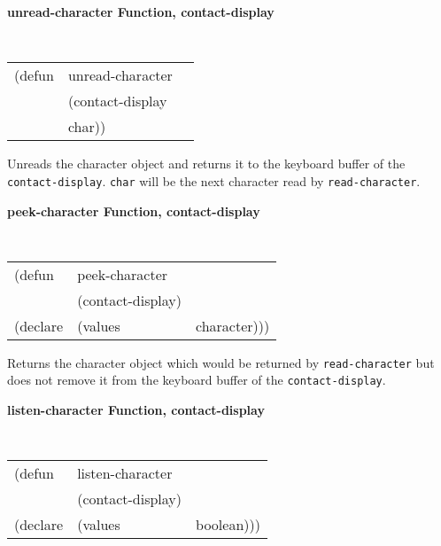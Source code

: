 \documentclass[twoside]{book}
\begin{document}
\begin{sloppy}
\begin{flushright}
{}\end{flushright}


{\samepage
{\large {\bf unread-character \hfill Function, contact-display}}
\begin{flushright} \parbox[t]{6.125in}{
\tt
\begin{tabular}{lll}
\raggedright
(defun & unread-character & \\
& (contact-display\\
& char))
\end{tabular}
\rm

}\end{flushright}}

\begin{flushright} \parbox[t]{6.125in}{
Unreads the character object and returns it to the keyboard buffer of the
{\tt contact-display}. {\tt char} will be the next
character read by {\tt read-character}.

}\end{flushright}


{\samepage
{\large {\bf peek-character \hfill Function, contact-display}}
\begin{flushright} \parbox[t]{6.125in}{
\tt
\begin{tabular}{lll}
\raggedright
(defun & peek-character & \\
& (contact-display)\\
(declare &(values &character)))
\end{tabular}
\rm

}\end{flushright}}

\begin{flushright} \parbox[t]{6.125in}{
Returns the character object which would be returned by {\tt read-character} but does
not remove it from the keyboard buffer of the {\tt contact-display}.

}\end{flushright}



{\samepage
{\large {\bf listen-character \hfill Function, contact-display}}
\begin{flushright} \parbox[t]{6.125in}{
\tt
\begin{tabular}{lll}
\raggedright
(defun & listen-character & \\
& (contact-display)\\
(declare &(values &boolean)))
\end{tabular}
\rm

}
\end{flushright}}
\end{sloppy}
\end{document}
